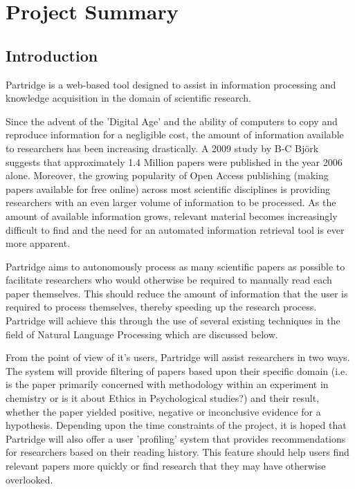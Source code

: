 \documentclass[12pt,a4paper]{article}
\begin{document}



\setlength{\parindent}{0pt}
\setlength{\parskip}{1.5ex plus 0.5ex minus 0.2ex}

\tableofcontents

\pagebreak

\section{Project Summary}

\subsection{Introduction}
Partridge is a web-based tool designed to assist in information processing and knowledge
acquisition in the domain of scientific research.

Since the advent of the 'Digital Age' and the ability of computers to copy and
reproduce information for a negligible cost, the amount of information
available to researchers has been increasing drastically.  A 2009 study by B-C
Bj\"{o}rk suggests that approximately 1.4 Million papers were published in the
year 2006 alone\cite{bjork2009}. Moreover, the growing popularity of Open Access
publishing (making papers available for free online\cite{Suber2012}) across
most scientific disciplines is providing researchers with an even larger volume
of information to be processed. As the amount of available information grows,
relevant material becomes increasingly difficult to find and the need for an
automated information retrieval tool is ever more apparent.

Partridge aims to autonomously process as many scientific papers as possible to
facilitate researchers who would otherwise be required to manually read each
paper themselves. This should reduce the amount of information that the user is
required to process themselves, thereby speeding up the research process.
Partridge will achieve this through the use of several existing techniques in
the field of Natural Language Processing which are discussed below.

From the point of view of it's users, Partridge will assist researchers in two
ways. The system will provide filtering of papers based upon their
specific domain (i.e. is the paper primarily concerned with methodology within
an experiment in chemistry or is it about Ethics in Psychological studies?) and
their result, whether the paper yielded positive, negative or inconclusive
evidence for a hypothesis. Depending upon the time constraints of the
project, it is hoped that Partridge will also offer a user 'profiling' system
that provides recommendations for researchers based on their reading history.
This feature should help users find relevant papers more quickly or find research that
they may have otherwise overlooked.
\end{document}
